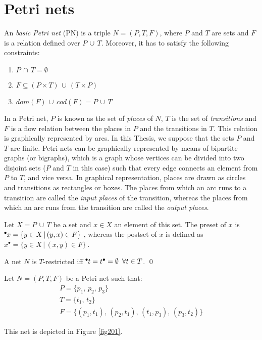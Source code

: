 \section{Petri nets}

\begin{definition} 
An \emph{basic Petri net} (PN) is a triple $N=(P,T,F)$, where $P$ and $T$
are sets and $F$ is a relation defined over $P \,\cup\,T$. Moreover, it has to satisfy
the following constraints:
\begin{enumerate}
\item $P \,\cap \,T = \emptyset$
\item $F \subseteq (P \times T) \,\cup\, (T \times P)$
\item $dom(F) \, \cup \, cod(F) = P \, \cup \, T$
\end{enumerate}

In a Petri net, $P$ is known as the set of \emph{places} of $N$, $T$ 
is the set of {\it transitions} and $F$ is a flow relation between the places in $P$
and the transitions in $T$. This relation is graphically represented by arcs.
In this Thesis, we suppose that the sets $P$ and $T$ are finite. Petri nets
can be graphically represented by means of bipartite graphs (or bigraphs), which
is a graph whose vertices can be divided into two disjoint sets ($P$ and $T$ in this case) such that 
every edge connects an element from $P$ to $T$, and vice versa. In graphical representation, places are drawn
as circles and transitions as rectangles or boxes.  The places 
from which an arc runs to a transition are called the \emph{input places} of the transition, whereas
the places from which an arc runs from the transition are called the \emph{output places}.

Let $X = P\,\cup\,T$ be a set and $x \in X$
an element of this set. The preset of $x$ is
$\hspace*{-0.4em}~^{\bullet} \hspace*{-0.05em}x = \{ y \in X \,|\, (y,x) \in F\}~$, whereas the postset of $x$ 
is defined as $x^{\bullet} = \{ y \in X \,|\, (x,y) \in F\}~$.

A net $N$ is $T$-restricted iff $\hspace*{-0.4em}~^{\bullet} \hspace*{-0.05em}t = t^{\bullet} =
\emptyset\,\,\,\forall t \in T$.
\qed
\end{definition}

\begin{example} Let $N=(P,T,F)$ be a Petri net such that:
\[\begin{array}{l}
P = \{ p_1,\,p_2,\,p_3\}\\
T = \{ t_1,\,t_2\}\\
F = \{ (p_1,t_1),\,(p_2,t_1),\,(t_1,p_3),\,(p_3,t_2)\}
\end{array}\]

This net is depicted in Figure \ref{fig201}.
\end{example}


